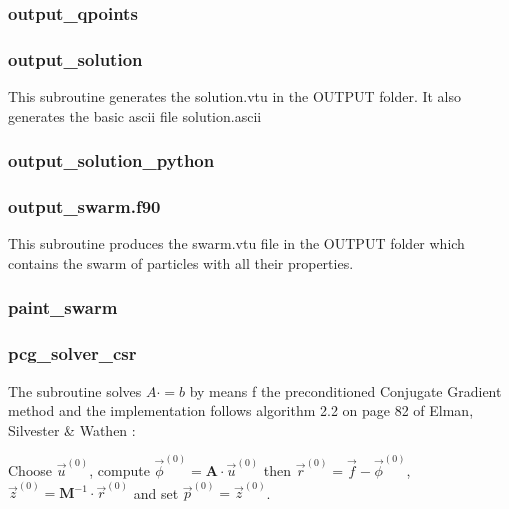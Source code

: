  \subsubsection{output\_qpoints}

 \subsubsection{output\_solution}
 This subroutine generates the {\filenamefont solution.vtu} in the {\foldernamefont OUTPUT}
 folder. It also generates the basic ascii file {\filenamefont solution.ascii}
 \subsubsection{output\_solution\_python}

 \subsubsection{output\_swarm.f90}
 This subroutine produces the {\filenamefont swarm.vtu} file in the 
 {\foldernamefont OUTPUT} folder which contains the 
 swarm of particles with all their properties.
 \subsubsection{paint\_swarm}
 
 \subsubsection{pcg\_solver\_csr}
 The subroutine solves $A\cdot = b$ by means f the preconditioned Conjugate Gradient method
 and the implementation follows algorithm 2.2 on page 82 of Elman, Silvester \&
 Wathen \cite{elsw}:
 
 Choose ${\vec u}^{(0)}$, compute ${\vec \phi}^{(0)}={\bm A}\cdot {\vec u}^{(0)}$ 
 then ${\vec r}^{(0)}={\vec f}-{\vec \phi}^{(0)}$, 
 ${\vec z}^{(0)}={\bm M}^{-1}\cdot {\vec r}^{(0)}$ and set ${\vec p}^{(0)}={\vec z}^{(0)}$.
 
